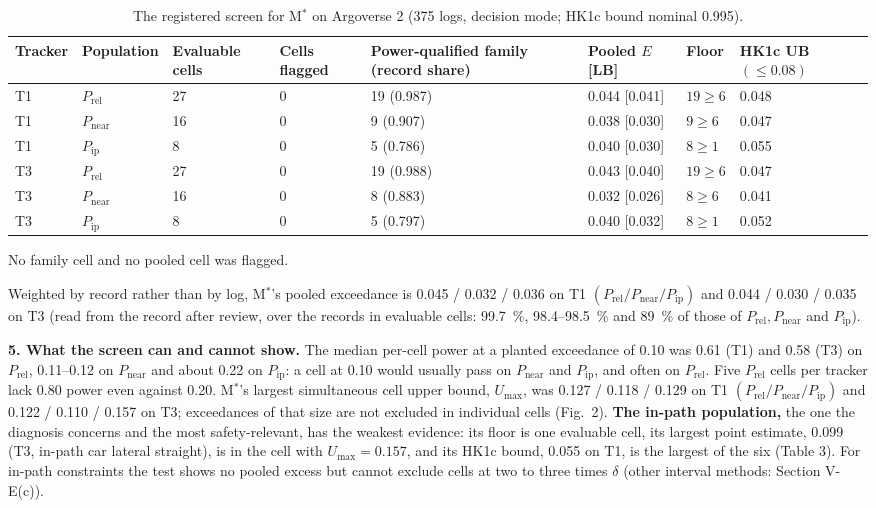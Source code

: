 \documentclass{ieeeaccess}
\begin{document}
\begin{table}[!t]
\centering
\caption{The registered screen for M$^{*}$ on Argoverse 2 (375 logs, decision mode; HK1c bound nominal 0.995).}
\label{tab:3}
\footnotesize
\setlength{\tabcolsep}{4pt}
\renewcommand{\arraystretch}{1.15}
\begin{tabular}{@{}L{0.101\textwidth}L{0.140\textwidth}L{0.127\textwidth}L{0.095\textwidth}L{0.121\textwidth}L{0.150\textwidth}L{0.079\textwidth}L{0.070\textwidth}@{}}
\hline
Tracker & Population & Evaluable cells & Cells flagged & Power-qualified family (record share) & Pooled $E$ [LB] & Floor & HK1c UB $(\leq 0.08)$ \\
\hline
T1 & $P_{\mathrm{rel}}$ & 27 & 0 & 19 (0.987) & 0.044 [0.041] & $19 \geq 6$ & 0.048 \\
T1 & $P_{\mathrm{near}}$ & 16 & 0 & 9 (0.907) & 0.038 [0.030] & $9 \geq 6$ & 0.047 \\
T1 & $P_{\mathrm{ip}}$ & 8 & 0 & 5 (0.786) & 0.040 [0.030] & $8 \geq 1$ & 0.055 \\
T3 & $P_{\mathrm{rel}}$ & 27 & 0 & 19 (0.988) & 0.043 [0.040] & $19 \geq 6$ & 0.047 \\
T3 & $P_{\mathrm{near}}$ & 16 & 0 & 8 (0.883) & 0.032 [0.026] & $8 \geq 6$ & 0.041 \\
T3 & $P_{\mathrm{ip}}$ & 8 & 0 & 5 (0.797) & 0.040 [0.032] & $8 \geq 1$ & 0.052 \\
\hline
\end{tabular}
\end{table}

No family cell and no pooled cell was flagged.

Weighted by record rather than by log, M$^{*}$'s pooled exceedance is 0.045 / 0.032 / 0.036 on T1 $(P_{\mathrm{rel}} / P_{\mathrm{near}} / P_{\mathrm{ip}})$ and 0.044 / 0.030 / 0.035 on T3 (read from the record after review, over the records in evaluable cells: 99.7~\%, 98.4--98.5~\% and 89~\% of those of $P_{\mathrm{rel}}, P_{\mathrm{near}}$ and $P_{\mathrm{ip}}$).

\textbf{5. What the screen can and cannot show.} The median per-cell power at a planted exceedance of 0.10 was 0.61 (T1) and 0.58 (T3) on $P_{\mathrm{rel}}$, 0.11--0.12 on $P_{\mathrm{near}}$ and about 0.22 on $P_{\mathrm{ip}}$: a cell at 0.10 would usually pass on $P_{\mathrm{near}}$ and $P_{\mathrm{ip}}$, and often on $P_{\mathrm{rel}}$. Five $P_{\mathrm{rel}}$ cells per tracker lack 0.80 power even against 0.20. M$^{*}$'s largest simultaneous cell upper bound, $U_{\max}$, was 0.127 / 0.118 / 0.129 on T1 $(P_{\mathrm{rel}} / P_{\mathrm{near}} / P_{\mathrm{ip}})$ and 0.122 / 0.110 / 0.157 on T3; exceedances of that size are not excluded in individual cells (Fig.~2). \textbf{The in-path population,} the one the diagnosis concerns and the most safety-relevant, has the weakest evidence: its floor is one evaluable cell, its largest point estimate, 0.099 (T3, in-path car lateral straight), is in the cell with $U_{\max} = 0.157$, and its HK1c bound, 0.055 on T1, is the largest of the six (Table 3). For in-path constraints the test shows no pooled excess but cannot exclude cells at two to three times $\delta$ (other interval methods: Section V-E(c)).
\end{document}
